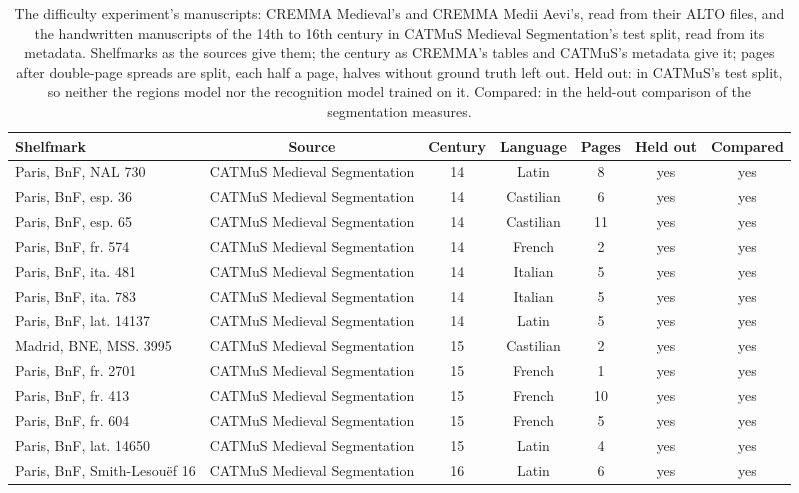 \begin{table}[htbp]
  \centering
  \caption{The difficulty experiment's manuscripts: CREMMA Medieval's and CREMMA Medii Aevi's, read from their ALTO files, and the handwritten manuscripts of the 14th to 16th century in CATMuS Medieval Segmentation's test split, read from its metadata. Shelfmarks as the sources give them; the century as CREMMA's tables and CATMuS's metadata give it; pages after double-page spreads are split, each half a page, halves without ground truth left out. Held out: in CATMuS's test split, so neither the regions model nor the recognition model trained on it. Compared: in the held-out comparison of the segmentation measures.}
  \label{tab:difficulty_material}
  \begin{tabular}{lcccccc}
    \toprule
    Shelfmark & Source & Century & Language & Pages & Held out & Compared \\
    \midrule
    Paris, BnF, NAL 730 & CATMuS Medieval Segmentation & 14 & Latin & 8 & yes & yes \\
    Paris, BnF, esp. 36 & CATMuS Medieval Segmentation & 14 & Castilian & 6 & yes & yes \\
    Paris, BnF, esp. 65 & CATMuS Medieval Segmentation & 14 & Castilian & 11 & yes & yes \\
    Paris, BnF, fr. 574 & CATMuS Medieval Segmentation & 14 & French & 2 & yes & yes \\
    Paris, BnF, ita. 481 & CATMuS Medieval Segmentation & 14 & Italian & 5 & yes & yes \\
    Paris, BnF, ita. 783 & CATMuS Medieval Segmentation & 14 & Italian & 5 & yes & yes \\
    Paris, BnF, lat. 14137 & CATMuS Medieval Segmentation & 14 & Latin & 5 & yes & yes \\
    Madrid, BNE, MSS. 3995 & CATMuS Medieval Segmentation & 15 & Castilian & 2 & yes & yes \\
    Paris, BnF, fr. 2701 & CATMuS Medieval Segmentation & 15 & French & 1 & yes & yes \\
    Paris, BnF, fr. 413 & CATMuS Medieval Segmentation & 15 & French & 10 & yes & yes \\
    Paris, BnF, fr. 604 & CATMuS Medieval Segmentation & 15 & French & 5 & yes & yes \\
    Paris, BnF, lat. 14650 & CATMuS Medieval Segmentation & 15 & Latin & 4 & yes & yes \\
    Paris, BnF, Smith-Lesouëf 16 & CATMuS Medieval Segmentation & 16 & Latin & 6 & yes & yes \\

\end{tabular}
\end{table}
